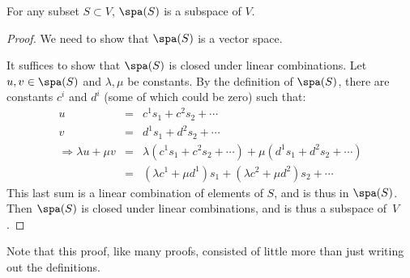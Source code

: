 
\begin{lemma}
For any subset $S\subset V$, $\spa(S)$ is a subspace of $V$.
\end{lemma}

\begin{proof}
We need to show that $\spa(S)$ is a vector space.

It suffices to show that $\spa(S)$ is closed under linear combinations.  Let $u,v\in \spa(S)$ and $\lambda, \mu$ be constants.  By the definition of $\spa(S)$, there are constants $c^i$ and $d^i$ (some of which could be zero) such that:
\begin{eqnarray*}
u & = & c^1s_1+c^2s_2+\cdots \\
v & = & d^1s_1+d^2s_2+\cdots \\
\Rightarrow \lambda u + \mu v & = & \lambda (c^1s_1+c^2s_2+\cdots ) + \mu (d^1s_1+d^2s_2+\cdots ) \\
& = & (\lambda c^1+\mu d^1)s_1 + (\lambda c^2+\mu d^2)s_2 + \cdots
\end{eqnarray*}
This last sum is a linear combination of elements of $S$, and is thus in $\spa(S)$.  Then $\spa(S)$ is closed under linear combinations, and is thus a subspace of~$V$.
\end{proof}

Note that this proof, like many proofs, consisted of little more than just writing out the definitions.



